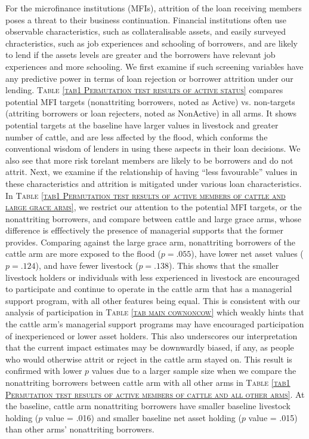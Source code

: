 	For the microfinance institutions (MFIs), attrition of the loan receiving members poses a threat to their business continuation. Financial institutions often use observable characteristics, such as collateralisable assets, and easily surveyed chracteristics, such as job experiences and schooling of borrowers, and are likely to lend if the assets levels are greater and the borrowers have relevant job experiences and more schooling. We first examine if such screening variables have any predictive power in terms of loan rejection or borrower attrition under our lending. \textsc{\normalsize Table \ref{tab1 Permutation test results of active status}} compares potential MFI targets (nonattriting borrowers, noted as \textsf{Active}) vs. non-targets (attriting borrowers or loan rejecters, noted as \textsf{NonActive}) in all arms. It shows potential targets at the baseline have larger values in livestock and greater number of cattle, and are less affected by the flood, which conforms the conventional wisdom of lenders in using these aspects in their loan decisions. We also see that more risk torelant members are likely to be borrowers and do not attrit. Next, we examine if the relationship of having ``less favourable'' values in these characteristics and attrition is mitigated under various loan characteristics. In \textsc{\normalsize Table \ref{tab1 Permutation test results of active members of cattle and large grace arms}}, we restrict our attention to the potential MFI targets, or the nonattriting borrowers, and compare between \textsf{cattle} and \textsf{large grace} arms, whose difference is efffectively the presence of managerial supports that the former provides. \label{PageOfAttrition}%
	Comparing against the \textsf{large grace} arm, nonattriting borrowers of the \textsf{cattle} arm are more exposed to the flood ($p=.055$), have lower net asset values ($p=.124$), and have fewer livestock ($p=.138$). This shows that the smaller livestock holders or individuals with less experienced in livestock are encouraged to participate and continue to operate in the \textsf{cattle} arm that has a managerial support program, with all other features being equal. This is consistent with our analysis of participation in \textsc{\normalsize Table \ref{tab main cownoncow}} which weakly hints that the \textsf{cattle} arm's managerial support programs may have encouraged participation of inexperienced or lower asset holders. This also underscores our interpretation that the current impact estimates may be downwardly biased, if any, as people who would otherwise attrit or reject in the \textsf{cattle} arm stayed on. This result is confirmed with lower $p$ values due to a larger sample size when we compare the nonattriting borrowers between \textsf{cattle} arm with all other arms in \textsc{\normalsize Table \ref{tab1 Permutation test results of active members of cattle and all other arms}}. At the baseline, \textsf{cattle} arm nonattriting borrowers have smaller baseline livestock holding ($p$ value = .016) and smaller baseline net asset holding ($p$ value = .015) than other arms' nonattriting borrowers. 


